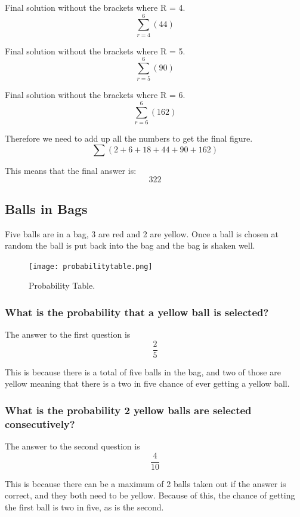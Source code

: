 \documentclass[a4paper,12pt]{article}
\begin{document}
Final solution without the brackets where R = 4.
\[
  \sum^6_{r=4} (44)
\]

Final solution without the brackets where R = 5.
\[
  \sum^6_{r=5} (90)
\]

Final solution without the brackets where R = 6.
\[
  \sum^6_{r=6} (162)
\]

\newpage

Therefore we need to add up all the numbers to get the final figure.
\[
  \sum (2 + 6 + 18 + 44 + 90 + 162)
\]

This means that the final answer is:
\[
  322
\]

\newpage

\subsection{Balls in Bags}

Five balls are in a bag, 3 are red and 2 are yellow. Once a ball is chosen at random the ball is put back into the bag and the bag is shaken well.

\begin{figure}[h!]
  \texttt{[image: probabilitytable.png]}
  \caption{Probability Table.}
  \label{fig:chart1}
\end{figure}

\newpage

\subsubsection{What is the probability that a yellow ball is selected?}

The answer to the first question is
\[
  \frac{2}{5}
\]

This is because there is a total of five balls in the bag, and two of those are yellow meaning that there is a two in five chance of ever getting a yellow ball.

\subsubsection{What is the probability 2 yellow balls are selected consecutively?}

The answer to the second question is
\[
  \frac{4}{10}
\]

This is because there can be a maximum of 2 balls taken out if the answer is correct, and they both need to be yellow. Because of this, the chance of getting the first ball is two in five, as is the second.
\end{document}
